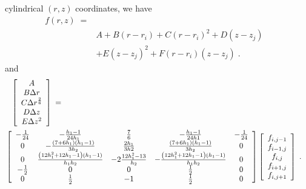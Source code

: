 cylindrical $\left(r,z\right)$ coordinates, we have
\begin{eqnarray}
f\left(r,z\right) \; = & & \nonumber \\
& A + B \left(r - r_i\right) + C \left(r - r_i\right)^2
+ D \left(z - z_j\right) & \nonumber \\
& + E \left(z - z_j\right)^2 +
F \left(r - r_i\right)\left(z - z_j\right) \; . &
\end{eqnarray}
and
\begin{eqnarray}
\left[ \begin{array}{c}
A \\ B\Delta r \\ C\Delta r^{\frac{2}{6}} \\ D\Delta z  \\ E \Delta z^2
\end{array} \right] \: = \hspace{-1.0in} & & \nonumber \\
& \left[ \begin{array}{cccccc}
-\frac{1}{24} & -\frac{h_1-1}{24h_1}  & \frac{7}{6}      & -\frac{h_1-1}{24h1}  & -\frac{1}{24} \\
0
& - \frac{\left(7+6h_1\right)\left(h_1-1\right)}{3h_2}
& \frac{2h_1}{3h2}
& \frac{\left(7+6h_1\right)\left(h_1-1\right)}{3h_2}
& 0  \\
0
& \frac{\left(12h_1^2 + 12 h_1 - 1\right)\left(h_1 - 1\right)}{h_1h_2}
& -2 \frac{12 h_1^2 -13}{h_2}
& - \frac{\left(12h_1^2 + 12 h_1 - 1\right)\left(h_1 - 1\right)}{h_1h_2}
& 0 \\
- \frac{1}{2}
& 0
& 0
& \frac{1}{2}
& 0 \\
0
& \frac{1}{2}
& - 1
& \frac{1}{2}
& 0 \\
\end{array} \right]
\left[ \begin{array}{c}
f_{i,j-1} \\ f_{i-1,j} \\ f_{i,j} \\
f_{i+1,j} \\ f_{i,j+1}
\end{array} \right]  \; . &
\end{eqnarray}


